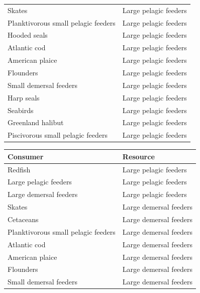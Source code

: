 \begin{singlespace}
\begin{table}[h!]
\begin{tabular}{|l|l|}
      Skates                              & Large pelagic feeders \\
      Planktivorous small pelagic feeders & Large pelagic feeders \\
      Hooded seals                        & Large pelagic feeders \\
      Atlantic cod                        & Large pelagic feeders \\
      American plaice                     & Large pelagic feeders \\
      Flounders                           & Large pelagic feeders \\
      Small demersal feeders              & Large pelagic feeders \\
      Harp seals                          & Large pelagic feeders \\
      Seabirds                            & Large pelagic feeders \\
      Greenland halibut                   & Large pelagic feeders \\
      Piscivorous small pelagic feeders   & Large pelagic feeders \\
      \hline
    \end{tabular}
\end{table}
\newpage
\begin{table}[h!]
    \centering
    \begin{tabular}{|l|l|}
    \hline
    Consumer               & Resource \\
    \hline    \hline
    Redfish                             & Large pelagic feeders \\
    Large pelagic feeders               & Large pelagic feeders \\
    Large demersal feeders              & Large pelagic feeders \\
    Skates                              & Large demersal feeders    \\
    Cetaceans                           & Large demersal feeders    \\
    Planktivorous small pelagic feeders & Large demersal feeders    \\
    Atlantic cod                        & Large demersal feeders    \\
    American plaice                     & Large demersal feeders    \\
    Flounders                           & Large demersal feeders    \\
    Small demersal feeders              & Large demersal feeders    \\

\end{tabular}
\end{table}
\end{singlespace}
